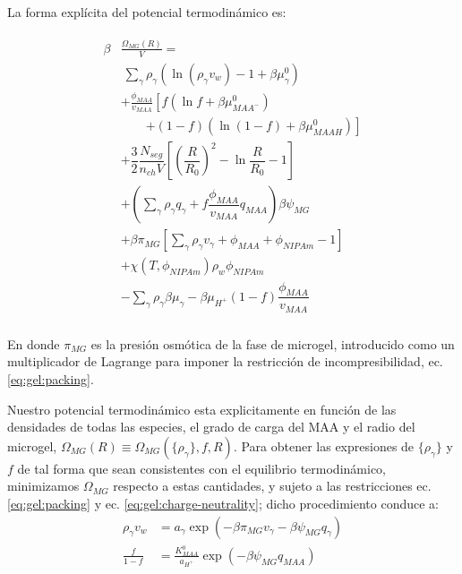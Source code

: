 La forma expl\'icita del potencial termodin\'amico es:




%
\begin{align}
\begin{aligned}
\beta&\frac{\Omega_{MG}(R)}{V}=\\& ~ \sum_{\gamma} \rho_\gamma\left(\ln\left(\rho_\gamma v_w\right) -1 + \beta\mu^0_\gamma\right) \\
& + \frac{\phi_{MAA}}{v_{MAA}} \left[f(\ln f+ \beta\mu^0_{MAA^-})\right.\\
&\qquad\left.+(1-f)(\ln (1-f)+\beta\mu^0_{MAAH})\right] \\
%
& + \dfrac{3}{2}\dfrac{N_{seg}}{n_{ch} V}\left[\left(\dfrac{R}{R_0}\right)^2 - \ln\dfrac{R}{R_0} -1\right] \\
%
& +  \left(\sum_{\gamma } {\rho_\gamma q_\gamma + f\dfrac{\phi_{MAA}}{v_{MAA}}q_{MAA}}\right)\beta\psi_{MG}\\
%
& +\beta\pi_{MG} \left[ \sum_{\gamma } \rho_\gamma v_\gamma  + \phi_{MAA} + \phi_{NIPAm} -1 \right] \\
%
& + \chi (T, \phi_{NIPAm})\rho_w \phi_{NIPAm} \\
%
& -\sum_{\gamma }{\rho_\gamma\beta\mu_\gamma}
 -\beta\mu_{H^+}(1-f)\dfrac{\phi_{MAA}}{v_{MAA}}\\
%
%
\end{aligned}
\label{eq:gel:free-energy}
\end{align}




\noindent En donde $\pi_{MG}$ es la presi\'on osm\'otica de la fase de microgel, introducido como un multiplicador de Lagrange para imponer la restricci\'on de incompresibilidad, ec. \ref{eq:gel:packing}.


Nuestro potencial termodin\'amico esta explicitamente en funci\'on de las densidades de todas las especies, el grado de carga del MAA y el radio del microgel, $\Omega_{MG}(R)\equiv\Omega_{MG}(\{\rho_\gamma\},f,R)$.
Para obtener las expresiones de $\{\rho_\gamma\}$ y $f$ de tal forma que sean consistentes con el equilibrio termodin\'amico, minimizamos $\Omega_{MG}$ respecto a estas cantidades, y  sujeto a las restricciones ec. \ref{eq:gel:packing} y ec. \ref{eq:gel:charge-neutrality}; dicho procedimiento conduce a: 
%
%
\begin{align}
\rho_\gamma v_w &= a_\gamma \exp(-\beta\pi_{MG}v_\gamma -\beta\psi_{MG}q_{\gamma})\\
\frac{f}{1-f}&= \frac{K^0_{MAA}}{a_{H^+}}\exp(-\beta\psi_{MG}q_{MAA})\label{eq:gel:fcharge}
\end{align}


